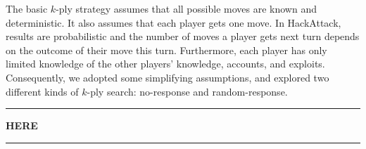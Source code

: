 The basic $k$-ply strategy assumes that all possible moves are known and deterministic. It also assumes that each player gets one move. In HackAttack, results are probabilistic and the number of moves a player gets next turn depends on the outcome of their move this turn. Furthermore, each player has only limited knowledge of the other players' knowledge, accounts, and exploits. Consequently, we adopted some simplifying assumptions, and explored two different kinds of $k$-ply search: no-response and random-response.





{\vspace*{0.2cm}\hrule 
  {\begin{center} \color{red} \Huge \bf{HERE} \end{center} }\hrule \vspace*{0.2cm} }